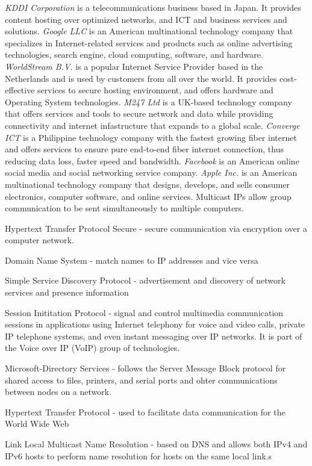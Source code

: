 \documentclass[journal]{IEEE/IEEEtran}
\begin{document}
\textit{KDDI Corporation} is a telecommunications business based in Japan. It provides content hosting over optimized networks, and ICT and business services and solutions. \textit{Google LLC} is an American multinational technology company that specializes in Internet-related services and products such as online advertising technologies, search engine, cloud computing, software, and hardware. \textit{WorldStream B.V.} is a popular Internet Service Provider based in the Netherlands and is used by customers from all over the world. It provides cost-effective services to secure hosting environment, and offers hardware and Operating System technologies.
\textit{M247 Ltd} is a UK-based technology company that offers  services and tools to secure network and data while providing connectivity and internet infastructure that expands to a global scale. \textit{Converge ICT} is a Philippine technology company with the fastest growing fiber internet and offers services to ensure pure end-to-end fiber internet connection, thus reducing data loss, faster speed and bandwidth. \textit{Facebook} is an American online social media and social networking service company. \textit{Apple Inc.} is an American multinational technology company that designs, develops, and sells consumer electronics, computer software, and online services. Multicast IPs allow group communication to be sent simultaneously to multiple computers.


Hypertext Transfer Protocol Secure - secure communication  via encryption over a computer network.

Domain Name System - match names to IP addresses and vice versa

Simple Service Discovery Protocol - advertisement and discovery of network services and presence information

Session Inititation Protocol - signal and control multimedia communication sessions in applications using Internet telephony for voice and video calls, private IP telephone systems, and even instant messaging over IP networks. It is part of the Voice over IP (VoIP) group of technologies.

Microsoft-Directory Services - follows the Server Message Block protocol for shared access to files, printers, and serial ports and ohter communications between nodes on a network.

Hypertext Transfer Protocol - used to facilitate data communication for the World Wide Web

Link Local Multicast Name Resolution - based on DNS and allows both IPv4 and IPv6 hosts to perform name resolution for hosts on the same local link.s
\end{document}
